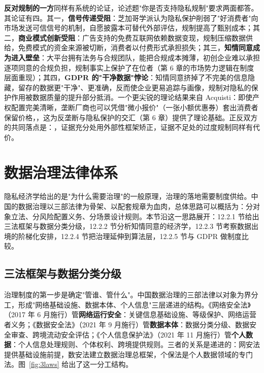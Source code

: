\textbf{反对规制的一方}同样有系统的论证，论述题"你是否支持隐私规制"要求两面都答。其论证有四。其一，\textbf{信号传递受阻}：芝加哥学派认为隐私保护削弱了"好消费者"向市场发送可信信号的机制，自愿披露本可替代外部评估，规制提高了甄别成本；其二，\textbf{商业模式创新受阻}：广告支持的免费互联网依赖数据变现，规制压缩数据供给，免费模式的资金来源被切断，消费者以付费形式承担损失；其三，\textbf{知情同意成为进入壁垒}：大平台拥有法务与合规团队，能把合规成本摊薄，初创企业难以承担逐项同意的合规负担，规制事实上保护了在位者（第 6 章的市场势力逻辑在制度层面重现）；其四，\textbf{GDPR 的"干净数据"悖论}：知情同意挤掉了不完美的信息隐藏，留存的数据更"干净"、更准确，反而使企业更易追踪与画像，规制对隐私的保护作用被数据质量的提升部分抵消。一个更尖锐的理论结果来自 Acquisti：即使产权配置完美清晰，垄断厂商也可以凭借"微小报价"（一张小额优惠券）套出消费者保留价格，，这为反垄断与隐私保护的交汇（第 6 章）提供了理论基础。正反双方的共同落点是：，证据充分处用外部性框架矫正，证据不足处的过度规制同样有代价。

\section{数据治理法律体系}

隐私经济学给出的是"为什么需要治理"的一般原理，治理的落地需要制度供给。中国的数据治理以三部法律为骨架、以配套规章为血肉，总体思路可以概括为：分对象立法、分风险配置义务、分场景设计规则。本节沿这一思路展开：12.2.1 节给出三法框架与数据分类分级，12.2.2 节分析知情同意的经济学，12.2.3 节考察数据出境的阶梯化安排，12.2.4 节把治理延伸到算法层，12.2.5 节与 GDPR 做制度比较。

\subsection{三法框架与数据分类分级}

治理制度的第一步是确定"管谁、管什么"。中国数据治理的三部法律以对象为界分工，形成"网络基础设施、数据本体、个人信息"三层递进的结构。《网络安全法》（2017 年 6 月施行）管\textbf{网络运行安全}：关键信息基础设施、等级保护、网络运营者义务；《数据安全法》（2021 年 9 月施行）管\textbf{数据本体}：数据分类分级、数据安全审查、跨境流动安全评估；《个人信息保护法》（2021 年 11 月施行）管\textbf{个人数据}：个人信息处理规则、个体权利、跨境提供规则。三者的关系是递进的：网安法提供基础设施前提，数安法建立数据治理总框架，个保法是个人数据领域的专门法。图~\ref{fig:3laws} 给出了这一分工结构。

